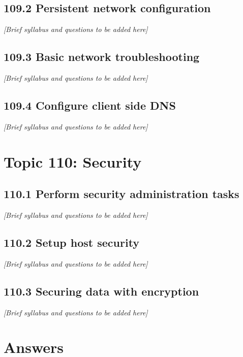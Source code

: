 \documentclass[12pt,a4paper]{report}
\begin{document}
\section{109.2 Persistent network configuration}
\textit{[Brief syllabus and questions to be added here]}

\section{109.3 Basic network troubleshooting}
\textit{[Brief syllabus and questions to be added here]}

\section{109.4 Configure client side DNS}
\textit{[Brief syllabus and questions to be added here]}

\chapter{Topic 110: Security}
\section{110.1 Perform security administration tasks}
\textit{[Brief syllabus and questions to be added here]}

\section{110.2 Setup host security}
\textit{[Brief syllabus and questions to be added here]}

\section{110.3 Securing data with encryption}
\textit{[Brief syllabus and questions to be added here]}

\clearpage

\chapter*{Answers} 

\end{document}
